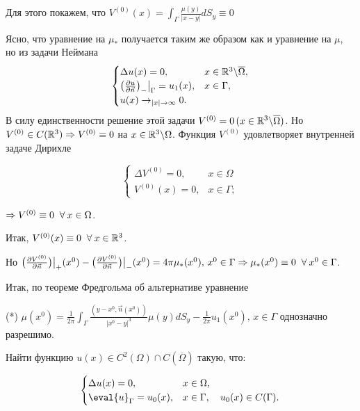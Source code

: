 Для этого покажем, что $V^{(0)}(x) = \int_{\Gamma} \frac{\mu(y)}{|x - y|}dS_y \equiv 0$

Ясно, что уравнение на $\mu_*$ получается таким же образом как и уравнение на $\mu$, но из задачи Неймана 
\begin{equation}
 \begin{cases}
 \Delta u(x) = 0, &x \in \mathbb{R}^3 \backslash \overline{\Omega},
  \\
   \big(\frac{\partial u}{\partial \vec{n}}\big)_- \big|_{{\Gamma}} = u_1(x), & x \in {\Gamma},
   \\
   u(x) \to_{|x| \to \infty} 0. \\
 \end{cases}
\end{equation}
В силу единственности решение этой задачи $V^{(0)} = 0 \, (x \in \mathbb{R}^3 \backslash \overline{\Omega})$. Но $V^{(0)} \in C(\mathbb{R}^3) \Rightarrow V^{(0)} \equiv 0$ на $x \in \mathbb{R}^3 \backslash \Omega$. Функция $V^{(0)}$ удовлетворяет внутренней задаче Дирихле

\begin{equation}
 \begin{cases}
 \Delta V^{(0)} = 0, & x \in \Omega
  \\
  V^{(0)}(x) = 0, &x \in {\Gamma};
 \end{cases}
\end{equation}

$\Rightarrow V^{(0)} \equiv 0 \;\;\forall\: x \in \Omega$.

Итак, $V^{(0)}(x) \equiv 0 \;\;\forall\: x \in \mathbb{R}^3$. 

Но $\big(\frac{\partial V^{(0)}}{\partial \vec{n}}\big) \big|_+(x^0) - \big(\frac{\partial V^{(0)}}{\partial \vec{n}}\big) \big|_-(x^0) = 4\pi \mu_*(x^0), \, x^0 \in {\Gamma} \Rightarrow \mu_*(x^0) \equiv 0 \;\;\forall\: x^0 \in {\Gamma}$.

Итак, по теореме Фредгольма об альтернативе уравнение 

(*) $\mu(x^0) = \frac{1}{2\pi}\int_{\Gamma} \frac{(y - x^0, \vec{n}(x^0))}{|x^0 - y|^3}\mu(y)dS_y - \frac{1}{2\pi}u_1(x^0), \, x \in {\Gamma}$ однозначно разрешимо.


Найти функцию $u(x) \in C^2(\Omega) \cap C(\overline{\Omega})$ такую, что:

\begin{equation}
  \begin{cases}
	\Delta u(x) = 0, & x \in \Omega, \\
	\eval{u}_{\Gamma} = u_0(x), & x \in {\Gamma}, \quad u_0(x) \in C({\Gamma}).\\
\end{cases}
\end{equation}

